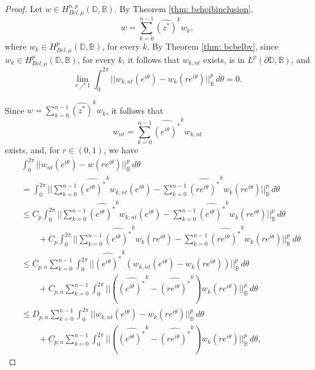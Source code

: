 \documentclass[12pt,reqno]{amsart}
\theoremstyle{definition}
\theoremstyle{remark}
\newcommand{\p}{\partial}
\newcommand{\bc}{\mathbb{B}}
\newcommand{\disk}{\mathbb{D}}
\begin{document}
\begin{proof}




 Let $w \in H^{n,p}_{Bel,\mu}(\disk,\bc)$. By Theorem \ref{thm: bchoibinclusion}, 
        \[
            w = \sum_{k = 0}^{n-1}  \widehat{(z^*)}^k w_k,
        \]
        where $w_k \in H^p_{Bel,\mu}(\disk,\bc)$, for every $k$. By Theorem \ref{thm: bcbelbv}, since $w_k \in H^p_{Bel,\mu}(\disk,\bc)$, for every $k$, it follows that $w_{k,nt}$ exists, is in $L^p(\p \disk,\bc)$, and 
        \begin{equation}\label{convfork}
            \lim_{r \nearrow 1} \int_0^{2\pi} ||w_{k,nt}(e^{i\theta}) - w_k(re^{i\theta}) ||^p_{\bc} \, d\theta  = 0. 
        \end{equation}

        Since $w = \sum_{k = 0}^{n-1}  \widehat{(z^*)}^k w_k$, it follows that 
        \[
            w_{nt} = \sum_{k = 0}^{n-1}  \widehat{(e^{i\theta})^*}^k w_{k,nt}
        \]
        exists, and, for $r \in (0,1)$, we have
        \begin{align*}
            &\int_0^{2\pi} ||w_{nt}(e^{i\theta}) - w(re^{i\theta}) ||^p_{\bc} \, d\theta \\
            &= \int_0^{2\pi} ||\sum_{k = 0}^{n-1}  \widehat{(e^{i\theta})^*}^k w_{k,nt}(e^{i\theta}) - \sum_{k = 0}^{n-1}  \widehat{(re^{i\theta})^*}^k w_k(re^{i\theta}) ||^p_{\bc} \, d\theta \\
            &\leq C_p \int_0^{2\pi} ||\sum_{k = 0}^{n-1}  \widehat{(e^{i\theta})^*}^k w_{k,nt}(e^{i\theta}) - \sum_{k = 0}^{n-1}  \widehat{(e^{i\theta})^*}^k w_k(re^{i\theta}) ||^p_{\bc} \, d\theta \\
            &\quad\quad + C_p\int_0^{2\pi} ||\sum_{k = 0}^{n-1}  \widehat{(e^{i\theta})^*}^k w_k(re^{i\theta}) - \sum_{k = 0}^{n-1}  \widehat{(re^{i\theta})^*}^k w_k(re^{i\theta}) ||^p_{\bc} \, d\theta \\
            &\leq C_{p,n} \sum_{k = 0}^{n-1} \int_0^{2\pi} ||  \widehat{(e^{i\theta})^*}^k (w_{k,nt}(e^{i\theta}) - w_k(re^{i\theta})) ||^p_{\bc} \, d\theta \\
            &\quad\quad + C_{p,n} \sum_{k = 0}^{n-1} \int_0^{2\pi}  ||  (\widehat{(e^{i\theta})^*}^k -  \widehat{(re^{i\theta})^*}^k )w_k(re^{i\theta}) ||^p_{\bc} \, d\theta \\
            &\leq D_{p,n} \sum_{k = 0}^{n-1} \int_0^{2\pi} ||  w_{k,nt}(e^{i\theta}) - w_k(re^{i\theta}) ||^p_{\bc} \, d\theta \\
            &\quad\quad + C_{p,n} \sum_{k = 0}^{n-1} \int_0^{2\pi}  ||  (\widehat{(e^{i\theta})^*}^k -  \widehat{(re^{i\theta})^*}^k )w_k(re^{i\theta}) ||^p_{\bc} \, d\theta ,

\end{align*}
\end{proof}
\end{document}
